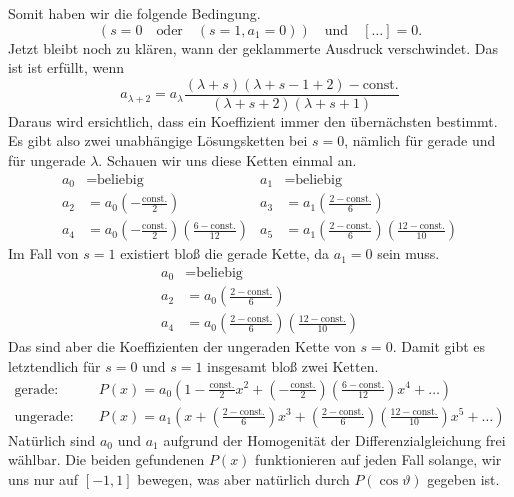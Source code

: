 \documentclass[a4paper,12pt,portrait]{book}
\numberwithin{equation}{section}
\begin{document}
Somit haben wir die folgende Bedingung.
\begin{equation*}
\left(s=0\quad\text{oder}\quad \left(s=1, a_1=0\right)\right)\quad\text{und}\quad [\hdots]=0.
\end{equation*}
Jetzt bleibt noch zu klären, wann der geklammerte Ausdruck verschwindet. Das ist ist erfüllt, wenn
\begin{equation*}
a_{\lambda+2}=a_\lambda\frac{(\lambda+s)(\lambda+s-1+2)-\text{const.}}{(\lambda+s+2)(\lambda+s+1)}
\end{equation*}
Daraus wird ersichtlich, dass ein Koeffizient immer den übernächsten bestimmt. Es gibt also zwei unabhängige Lösungsketten bei $s=0$, nämlich für gerade und für ungerade $\lambda$. Schauen wir uns diese Ketten einmal an. 
\begin{align*}
a_0 & = \text{beliebig} & a_1 &= \text{beliebig} \\
a_2 & = a_0\left(-\frac{\text{const.}}{2}\right)   & a_3 &= a_1\left(\frac{2-\text{const.}}{6}\right)\\
a_4 & =  a_0\left(-\frac{\text{const.}}{2}\right) \left(\frac{6-\text{const.}}{12}\right) & a_5 &= a_1\left(\frac{2-\text{const.}}{6}\right)\left(\frac{12-\text{const.}}{10}\right)
\end{align*}	
Im Fall von $s=1$ existiert bloß die gerade Kette, da $a_1=0$ sein muss.
\begin{align*}
a_0 & = \text{beliebig}  \\
a_2 &= a_0\left(\frac{2-\text{const.}}{6}\right)\\
a_4 &= a_0\left(\frac{2-\text{const.}}{6}\right)\left(\frac{12-\text{const.}}{10}\right)
\end{align*}
Das sind aber die Koeffizienten der ungeraden Kette von $s=0$. Damit gibt es letztendlich für $s=0$ und $s=1$ insgesamt bloß zwei Ketten.
\begin{align*}
\text{gerade:}\quad & P(x)=a_0\left(1-\frac{\text{const.}}{2}x^2 +  \left(-\frac{\text{const.}}{2}\right) \left(\frac{6-\text{const.}}{12}\right)x^4 + \hdots \right) \\
\text{ungerade:}\quad & P(x) = a_1\left( x + \left(\frac{2-\text{const.}}{6}\right)x^3 + \left(\frac{2-\text{const.}}{6}\right)\left(\frac{12-\text{const.}}{10}\right)x^5+\hdots \right)
\end{align*}
Natürlich sind $a_0$ und $a_1$ aufgrund der Homogenität der Differenzialgleichung frei wählbar. Die beiden gefundenen $P(x)$ funktionieren auf jeden Fall solange, wir uns nur auf $[-1,1]$ bewegen, was aber natürlich durch $P(\cos\vartheta)$ gegeben ist. 
\end{document}
